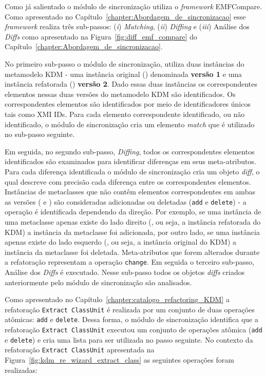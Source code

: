 Como já salientado o módulo de sincronização utiliza o \textit{framework} EMFCompare. Como apresentado no Capítulo~\ref{chapter:Abordagem_de_sincronizacao} esse \textit{framework} realiza três sub-passos: (\textit{i}) \textit{Matching}, (\textit{ii}) \textit{Diffing} e (\textit{iii}) Análise dos \textit{Diffs} como apresentado na Figura~\ref{fig:diff_emf_compare} do Capítulo~\ref{chapter:Abordagem_de_sincronizacao}.

No primeiro sub-passo o módulo de sincronização, utiliza duas instâncias do metamodelo KDM - uma instância original () denominada \textbf{versão 1} e uma instância refatorada () \textbf{versão 2}. Dado essas duas instâncias os correspondentes elementos nessas duas versões do metamodelo KDM são identificados. Os correspondentes elementos são identificados por meio de identificadores únicos tais como XMI IDs. Para cada elemento correspondente identificado, ou não identificado, o módulo de sincronização cria um elemento \textit{match} que é utilizado no sub-passo seguinte.

Em seguida, no segundo sub-passo, \textit{Diffing}, todos os correspondentes elementos identificados são examinados para identificar diferenças em seus meta-atributos. Para cada diferença identificada o módulo de sincronização cria um objeto \textit{diff}, o qual descreve com precisão cada diferença entre os correspondentes elementos. Instâncias de metaclasses que não contêm elementos correspondentes em ambas as versões ( e ) são consideradas adicionadas ou deletadas (\texttt{add} e \texttt{delete}) - a operação é identificada dependendo da direção. Por exemplo, se uma instância de uma metaclasse apenas existe do lado direito (, ou seja, a instância refatorada do KDM) a instância da metaclasse foi adicionada, por outro lado, se uma instância apenas existe do lado esquerdo (, ou seja, a instância original do KDM) a instância da metaclasse foi deletada. Meta-atributos que forem alterados durante a refatoração representam a operação \texttt{change}. Em seguida o terceiro sub-passo, Análise dos \textit{Diffs} é executado. Nesse sub-passo todos os objetos \textit{diffs} criados anteriormente pelo módulo de sincronização são analisados.


Como apresentado no Capítulo~\ref{chapter:catalogo_refactoring_KDM} a refatoração \texttt{Extract ClassUnit} é realizada por um conjunto de duas operações atômicas: \texttt{add} e  \texttt{delete}. Dessa forma, o módulo de sincronização identifica que a refatoração \texttt{Extract ClassUnit} executou um conjunto de operações atômica (\texttt{add} e  \texttt{delete}) e cria uma lista para ser utilizada no passo seguinte. No contexto da refatoração \texttt{Extract ClassUnit} apresentada na Figura~\ref{fig:kdm_re_wizard_extract_class} as seguintes operações foram realizadas: 

